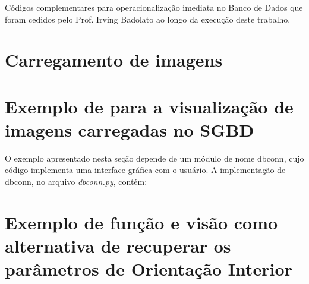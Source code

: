 \annex

Códigos complementares para operacionalização imediata no Banco de Dados que foram cedidos pelo Prof. Irving Badolato ao longo da execução deste trabalho.

\section{Carregamento de imagens}\label{script1}


\section{Exemplo de para a visualização de imagens carregadas no SGBD}\label{script3}


O exemplo apresentado nesta seção depende de um módulo de nome dbconn, cujo código implementa uma interface gráfica com o usuário. A implementação de dbconn, no arquivo \textit{dbconn.py}, contém:





\section{Exemplo de função e visão como alternativa de recuperar os parâmetros de Orientação Interior}\label{script2}

